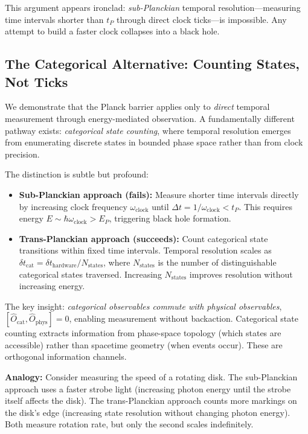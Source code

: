 \documentclass[twocolumn,10pt]{article}
\theoremstyle{remark}
\begin{document}
This argument appears ironclad: \textit{sub-Planckian} temporal resolution---measuring time intervals shorter than $t_P$ through direct clock ticks---is impossible. Any attempt to build a faster clock collapses into a black hole.

\subsection{The Categorical Alternative: Counting States, Not Ticks}

We demonstrate that the Planck barrier applies only to \textit{direct} temporal measurement through energy-mediated observation. A fundamentally different pathway exists: \textit{categorical state counting}, where temporal resolution emerges from enumerating discrete states in bounded phase space rather than from clock precision.

The distinction is subtle but profound:

\begin{itemize}
    \item \textbf{Sub-Planckian approach (fails):} Measure shorter time intervals directly by increasing clock frequency $\omega_{\text{clock}}$ until $\Delta t = 1/\omega_{\text{clock}} < t_P$. This requires energy $E \sim \hbar \omega_{\text{clock}} > E_P$, triggering black hole formation.

    \item \textbf{Trans-Planckian approach (succeeds):} Count categorical state transitions within fixed time intervals. Temporal resolution scales as $\delta t_{\text{cat}} = \delta t_{\text{hardware}}/N_{\text{states}}$, where $N_{\text{states}}$ is the number of distinguishable categorical states traversed. Increasing $N_{\text{states}}$ improves resolution without increasing energy.
\end{itemize}

The key insight: \textit{categorical observables commute with physical observables}, $[\hat{O}_{\text{cat}}, \hat{O}_{\text{phys}}] = 0$, enabling measurement without backaction. Categorical state counting extracts information from phase-space topology (which states are accessible) rather than spacetime geometry (when events occur). These are orthogonal information channels.

\textbf{Analogy:} Consider measuring the speed of a rotating disk. The sub-Planckian approach uses a faster strobe light (increasing photon energy until the strobe itself affects the disk). The trans-Planckian approach counts more markings on the disk's edge (increasing state resolution without changing photon energy). Both measure rotation rate, but only the second scales indefinitely.
\end{document}
